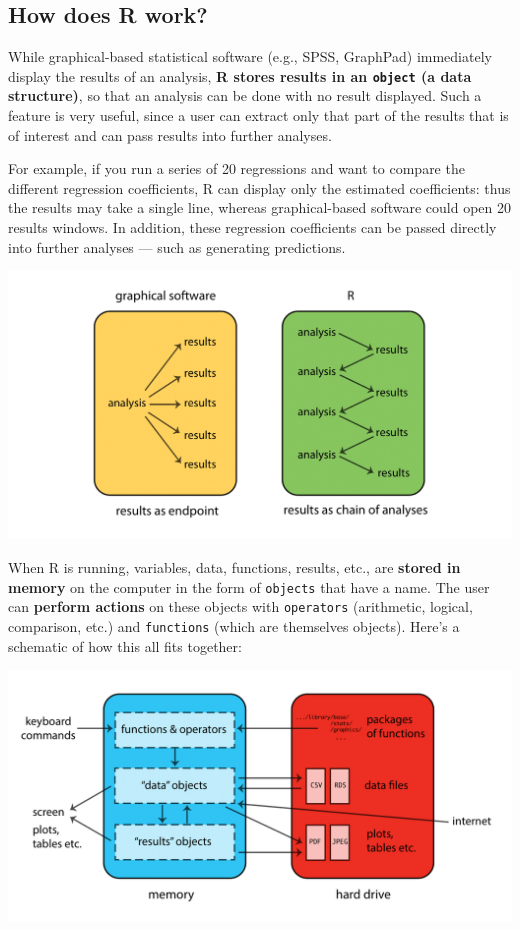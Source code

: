 \documentclass[
]{book}
\begin{document}
\hypertarget{how-does-r-work}{%
\subsection{How does R work?}\label{how-does-r-work}}

While graphical-based statistical software (e.g., SPSS, GraphPad) immediately display the results of an analysis, \textbf{R stores results in an \texttt{object} (a data structure)}, so that an analysis can be done with no result displayed. Such a feature is very useful, since a user can extract only that part of the results that is of interest and can pass results into further analyses.

For example, if you run a series of 20 regressions and want to compare the different regression coefficients, R can display only the estimated coefficients: thus the results may take a single line, whereas graphical-based software could open 20 results windows. In addition, these regression coefficients can be passed directly into further analyses --- such as generating predictions.

\includegraphics{R/Rintro/images/R_chain.png}

When R is running, variables, data, functions, results, etc., are \textbf{stored in memory} on the computer in the form of \texttt{objects} that have a name. The user can \textbf{perform actions} on these objects with \texttt{operators} (arithmetic, logical, comparison, etc.) and \texttt{functions} (which are themselves objects). Here's a schematic of how this all fits together:

\includegraphics{R/Rintro/images/R_works.png}
\end{document}
